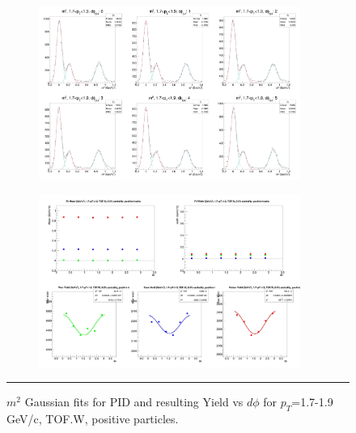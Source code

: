 \begin{figure}[H]
  \centering
    \begin{subfigure}[p]{1\textwidth}
   \centering
   \includegraphics[width=0.94\textwidth]{lowptfits/yieldvsdphi_tof1_cent0_ch1_pT-17-19.jpg}
    \end{subfigure}
    \begin{subfigure}[p]{1\textwidth}
   \centering
   \includegraphics[width=0.94\textwidth]{lowptfits/fitParams_tof1_cent0_ch1_pT-17-19.jpg}
    \end{subfigure}
    \rule{35em}{0.5pt}
  \caption[PID fits and Yield vs $d\phi$ for $p_T$=1.7-1.9 GeV/c, TOF.W, positive particles. ]{$m^2$ Gaussian fits for PID and resulting Yield vs $d\phi$ for $p_T$=1.7-1.9 GeV/c, TOF.W, positive particles.}
  \label{fig:fits17-19pos}
\end{figure}

